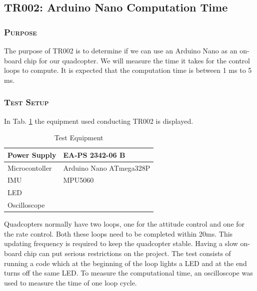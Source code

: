 
\subsection{TR002: Arduino Nano Computation Time}
         {}
                         
\subsubsection*{\textsc{\medium Purpose}}
The purpose of TR002 is to determine if we can use an Arduino Nano as an on-board chip for our quadcopter. We will measure the time it takes for the control loops to compute. It is expected that the computation time is between 1 ms to 5 ms. 

\subsubsection*{\textsc{\medium Test Setup}}
In Tab. \ref{tab:tab4} the equipment used conducting TR002 is displayed. 
\begin {table}[H]
    \begin{center}
    \caption {Test Equipment} 
    \label{tab:tab4} 
    \begin{tabular}{|l|l|}\hline 
        Power Supply & EA-PS 2342-06 B     \\ \hline
        Microcontoller & Arduino Nano ATmega328P \\ \hline
        IMU & MPU5060 \\ \hline
        LED & \\ \hline
        Oscilloscope & \\ \hline
        \end{tabular}
    \end{center}
\end{table}

Quadcopters normally have two loops, one for the attitude control and one for the rate control.  Both these loops need to be completed within 20ms. This updating frequency is required to keep the quadcopter stable. Having a slow on-board chip can put serious restrictions on the project. The test consists of running a code which at the beginning of the loop lights a LED and at the end turns off the same LED. To measure the computational time, an oscilloscope was used to measure the time of one loop cycle.

